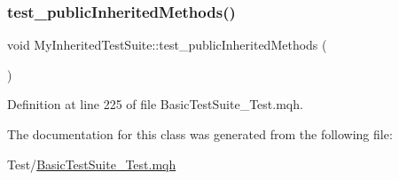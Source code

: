 \mbox{\label{class_my_inherited_test_suite_a1a6a926a8fb9d03618008b6d882a1cfe}} 
\subsubsection{\texorpdfstring{test\+\_\+public\+Inherited\+Methods()}{test\_publicInheritedMethods()}}
{\footnotesize\ttfamily void My\+Inherited\+Test\+Suite\+::test\+\_\+public\+Inherited\+Methods (\begin{DoxyParamCaption}{ }\end{DoxyParamCaption})\hspace{0.3cm}{\ttfamily [inline]}}



Definition at line 225 of file Basic\+Test\+Suite\+\_\+\+Test.\+mqh.



The documentation for this class was generated from the following file\+:\begin{DoxyCompactItemize}
\item 
Test/\mbox{\hyperlink{_basic_test_suite___test_8mqh}{Basic\+Test\+Suite\+\_\+\+Test.\+mqh}}\end{DoxyCompactItemize}
